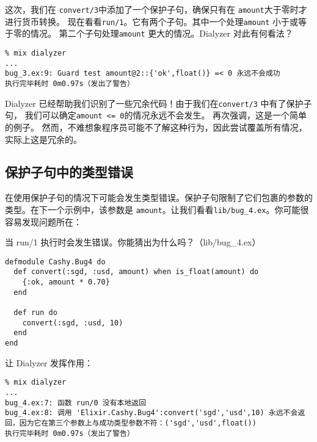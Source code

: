 这次，我们在 \texttt{convert/3}中添加了一个保护子句，确保只有在 \texttt{amount}大于零时才进行货币转换。
现在看看\texttt{run/1}。它有两个子句。其中一个处理\texttt{amount} 小于或等于零的情况。
第二个子句处理\texttt{amount} 更大的情况。Dialyzer 对此有何看法？

\begin{code}{}
\begin{verbatim}
% mix dialyzer
...
bug_3.ex:9: Guard test amount@2::{'ok',float()} =< 0 永远不会成功
执行完毕耗时 0m0.97s（发出了警告）
\end{verbatim}
\end{code}

Dialyzer 已经帮助我们识别了一些冗余代码！由于我们在\texttt{convert/3} 中有了保护子句，
我们可以确定\texttt{amount <= 0}的情况永远不会发生。
再次强调，这是一个简单的例子。
然而，不难想象程序员可能不了解这种行为，因此尝试覆盖所有情况，实际上这是冗余的。


\subsection{保护子句中的类型错误}

在使用保护子句的情况下可能会发生类型错误。保护子句限制了它们包裹的参数的类型。在下一个示例中，该参数是
\texttt{amount}。让我们看看\texttt{lib/bug\_4.ex}。你可能很容易发现问题所在：

\begin{code}{当 run/1 执行时会发生错误。你能猜出为什么吗？（lib/bug\_4.ex）}

\begin{verbatim}
defmodule Cashy.Bug4 do
  def convert(:sgd, :usd, amount) when is_float(amount) do
    {:ok, amount * 0.70}
  end

  def run do
    convert(:sgd, :usd, 10)
  end
end
\end{verbatim}
\end{code}

让 Dialyzer 发挥作用：

\begin{code}{}
\begin{verbatim}
% mix dialyzer
...
bug_4.ex:7: 函数 run/0 没有本地返回
bug_4.ex:8: 调用 'Elixir.Cashy.Bug4':convert('sgd','usd',10) 永远不会返回，因为它在第三个参数上与成功类型参数不符：('sgd','usd',float())
执行完毕耗时 0m0.97s（发出了警告）
\end{verbatim}
\end{code}

